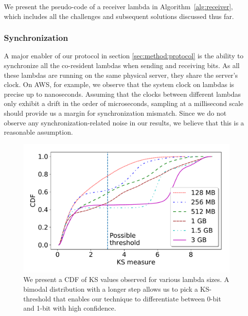 We present the pseudo-code of a receiver lambda in Algorithm~\ref{alg:receiver},
which includes all the challenges and subsequent solutions discussed thus
far.

\subsubsection{Synchronization} 
A major enabler of our protocol in section \ref{sec:method:protocol} is the ability 
to synchronize all the co-resident lambdas when sending and receiving 
bits. As all these lambdas are running on the same physical
server, they share the server's clock. On AWS, for example, we observe that the
system clock on lambdas is precise up to nanoseconds. 
Assuming that the clocks between different lambdas only exhibit a drift in the order
of microseconds, sampling at a millisecond scale should provide us a margin for
synchronization mismatch. Since we do not observe any synchronization-related
noise in our results, we believe that this is a reasonable assumption.


\begin{figure}[!t]
  \includegraphics[width=.99\linewidth]{fig/ksvalues.pdf}
  \caption{We present a CDF of KS values observed for various lambda sizes. A bimodal distribution 
  with a longer step allows us to pick a KS-threshold that enables our technique to differentiate 
  between 0-bit and 1-bit with high confidence. 
\label{fig:ks_values}}
\end{figure}


